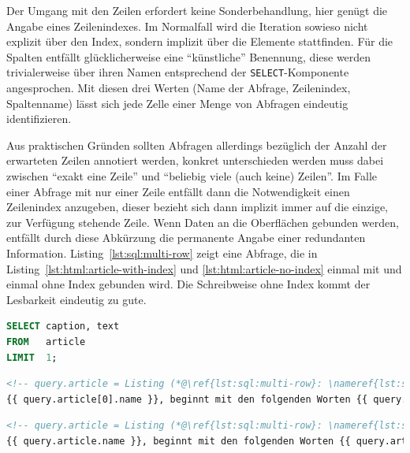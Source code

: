 Der Umgang mit den Zeilen erfordert keine Sonderbehandlung, hier genügt die Angabe eines Zeilenindexes. Im Normalfall wird die Iteration sowieso nicht explizit über den Index, sondern implizit über die Elemente stattfinden. Für die Spalten entfällt glücklicherweise eine "`künstliche"' Benennung, diese werden trivialerweise über ihren Namen entsprechend der \texttt{SELECT}-Komponente angesprochen. Mit diesen drei Werten (Name der Abfrage, Zeilenindex, Spaltenname) lässt sich jede Zelle einer Menge von Abfragen eindeutig identifizieren.

Aus praktischen Gründen sollten Abfragen allerdings bezüglich der Anzahl der erwarteten Zeilen annotiert werden, konkret unterschieden werden muss dabei zwischen "`exakt eine Zeile"' und "`beliebig viele (auch keine) Zeilen"'. Im Falle einer Abfrage mit nur einer Zeile entfällt dann die Notwendigkeit einen Zeilenindex anzugeben, dieser bezieht sich dann implizit immer auf die einzige, zur Verfügung stehende Zeile. Wenn Daten an die Oberflächen gebunden werden, entfällt durch diese Abkürzung die permanente Angabe einer redundanten Information. Listing~\ref{lst:sql:multi-row} zeigt eine Abfrage, die in Listing~\ref{lst:html:article-with-index} und \ref{lst:html:article-no-index} einmal mit und einmal ohne Index gebunden wird. Die Schreibweise ohne Index kommt der Lesbarkeit eindeutig zu gute.

\begin{lstlisting}[float=h, language=SQL, caption=Abfrage mit maximal einer Ergebniszeile,label=lst:sql:multi-row]
SELECT caption, text
FROM   article
LIMIT  1;
\end{lstlisting}

\begin{lstlisting}[float=h, language=HTML, caption=String-Interpolation mit Indexzugriff, label=lst:html:article-with-index]
<!-- query.article = Listing (*@\ref{lst:sql:multi-row}: \nameref{lst:sql:multi-row}@*) -->
{{ query.article[0].name }}, beginnt mit den folgenden Worten {{ query.article[0].text | truncatewords: 4 }}.
\end{lstlisting}

\begin{lstlisting}[float=h, language=HTML, caption=String-Interpolation mit implizitem Index, label=lst:html:article-no-index]
<!-- query.article = Listing (*@\ref{lst:sql:multi-row}: \nameref{lst:sql:multi-row}@*) -->
{{ query.article.name }}, beginnt mit den folgenden Worten {{ query.article.text | truncatewords: 4 }}.
\end{lstlisting}


